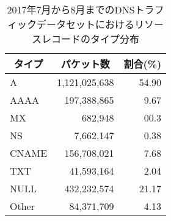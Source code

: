 \begin{table}[h]
 \caption[リソースレコードの分布]{2017年7月から8月までのDNSトラフィックデータセットにおけるリソースレコードのタイプ分布}
 \centering
  \begin{tabular}{lrr}
    \toprule
		\multicolumn{1}{c}{\textbf{タイプ}} & \multicolumn{1}{c}{\textbf{パケット数}} & \multicolumn{1}{c}{\textbf{割合(\%)}}\\
    \midrule
    A & 1,121,025,638 & 54.90\\
    AAAA & 197,388,865 & 9.67\\
    MX & 682,948 & 00.3\\
    NS & 7,662,147 & 0.38 \\
    CNAME & 156,708,021 & 7.68 \\
    TXT & 41,593,164 & 2.04 \\
    NULL & 432,232,574 & 21.17 \\
    Other & 84,371,709 & 4.13 \\
    \bottomrule
  \end{tabular}
 \label{tab:infil-rtype}
\end{table}

